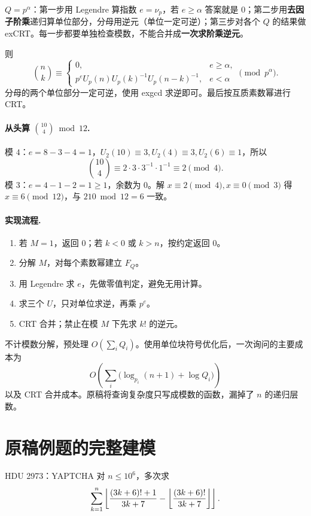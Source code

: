 \begin{tip}[三步流程]
$Q=p^\alpha$：第一步用 Legendre 算指数 $e=\nu_p$，若 $e\ge\alpha$ 答案就是 $0$；第二步用\textbf{去因子阶乘}递归算单位部分，分母用逆元（单位一定可逆）；第三步对各个 $Q$ 的结果做 exCRT。每一步都要单独检查模数，不能合并成\textbf{一次求阶乘逆元}。
\end{tip}

则
\[
\binom nk\equiv
\begin{cases}
0,&e\ge\alpha,\\
p^eU_p(n)U_p(k)^{-1}U_p(n-k)^{-1},&e<\alpha
\end{cases}\pmod{p^\alpha}.
\]
分母的两个单位部分一定可逆，使用 exgcd 求逆即可。最后按互质素数幂进行 CRT。


\paragraph{从头算 $\binom{10}{4}\bmod12$.}
模 $4$：$e=8-3-4=1$，$U_2(10)\equiv3,U_2(4)\equiv3,U_2(6)\equiv1$，所以
\[
 \binom{10}{4}\equiv2\cdot3\cdot3^{-1}\cdot1^{-1}\equiv2\pmod4.
\]
模 $3$：$e=4-1-2=1\ge1$，余数为 $0$。解 $x\equiv2\pmod4,x\equiv0\pmod3$ 得 $x\equiv6\pmod{12}$，与 $210\bmod12=6$ 一致。

\paragraph{实现流程.}
\begin{enumerate}
\item 若 $M=1$，返回 $0$；若 $k<0$ 或 $k>n$，按约定返回 $0$。
\item 分解 $M$，对每个素数幂建立 $F_Q$。
\item 用 Legendre 求 $e$，先做零值判定，避免无用计算。
\item 求三个 $U$，只对单位求逆，再乘 $p^e$。
\item CRT 合并；禁止在模 $M$ 下先求 $k!$ 的逆元。
\end{enumerate}
\cost 不计模数分解，预处理 $O(\sum_iQ_i)$。使用单位块符号优化后，一次询问的主要成本为
\[
O\!\left(\sum_i\bigl(\log_{p_i}(n+1)+\log Q_i\bigr)\right)
\]
以及 CRT 合并成本。原稿将查询复杂度只写成模数的函数，漏掉了 $n$ 的递归层数。


\section{原稿例题的完整建模}
\begin{problem}{HDU 2973：YAPTCHA}
对 $n\le10^6$，多次求
\[
\sum_{k=1}^n\left\lfloor \frac{(3k+6)!+1}{3k+7}-\left\lfloor \frac{(3k+6)!}{3k+7}\right\rfloor\right\rfloor.
\]
\end{problem}

